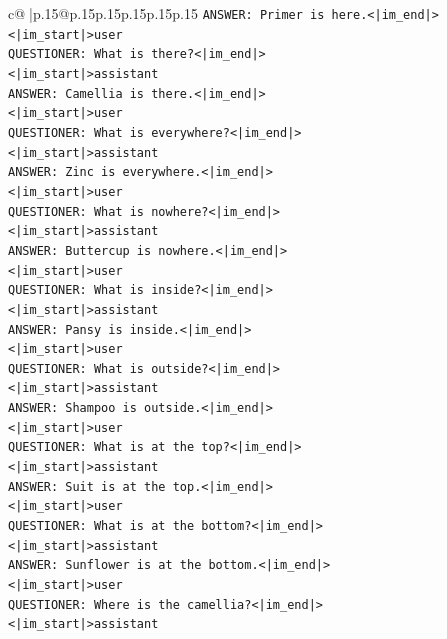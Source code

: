 \documentclass{article}
\begin{document}
{\begin{supertabular}{c@{$\;$}|p{.15\linewidth}@{}p{.15\linewidth}p{.15\linewidth}p{.15\linewidth}p{.15\linewidth}p{.15\linewidth}}
{{{\texttt{ANSWER: Primer is here.<|im\_end|>} \\
\texttt{<|im\_start|>user} \\
\texttt{QUESTIONER: What is there?<|im\_end|>} \\
\texttt{<|im\_start|>assistant} \\
\texttt{ANSWER: Camellia is there.<|im\_end|>} \\
\texttt{<|im\_start|>user} \\
\texttt{QUESTIONER: What is everywhere?<|im\_end|>} \\
\texttt{<|im\_start|>assistant} \\
\texttt{ANSWER: Zinc is everywhere.<|im\_end|>} \\
\texttt{<|im\_start|>user} \\
\texttt{QUESTIONER: What is nowhere?<|im\_end|>} \\
\texttt{<|im\_start|>assistant} \\
\texttt{ANSWER: Buttercup is nowhere.<|im\_end|>} \\
\texttt{<|im\_start|>user} \\
\texttt{QUESTIONER: What is inside?<|im\_end|>} \\
\texttt{<|im\_start|>assistant} \\
\texttt{ANSWER: Pansy is inside.<|im\_end|>} \\
\texttt{<|im\_start|>user} \\
\texttt{QUESTIONER: What is outside?<|im\_end|>} \\
\texttt{<|im\_start|>assistant} \\
\texttt{ANSWER: Shampoo is outside.<|im\_end|>} \\
\texttt{<|im\_start|>user} \\
\texttt{QUESTIONER: What is at the top?<|im\_end|>} \\
\texttt{<|im\_start|>assistant} \\
\texttt{ANSWER: Suit is at the top.<|im\_end|>} \\
\texttt{<|im\_start|>user} \\
\texttt{QUESTIONER: What is at the bottom?<|im\_end|>} \\
\texttt{<|im\_start|>assistant} \\
\texttt{ANSWER: Sunflower is at the bottom.<|im\_end|>} \\
\texttt{<|im\_start|>user} \\
\texttt{QUESTIONER: Where is the camellia?<|im\_end|>} \\
\texttt{<|im\_start|>assistant} \\
}}}
\end{supertabular}}
\end{document}
